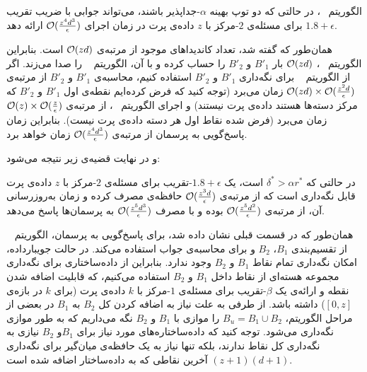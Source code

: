  
 الگوریتم ~، در حالتی که دو توپ بهینه $\alpha$-جداپذیر باشند، می‌تواند جوابی با ضریب تقریب $1.8 + \epsilon$ برای مسئله‌ی $2$-مرکز با $z$ داده‌ی پرت در زمان اجرای $\mathcal{O}(\frac{z^4d^3}{\epsilon})$ ارائه دهد.
 
 
 همان‌طور که گفته شد، تعداد کاندیداهای موجود از مرتبه‌ی $\mathcal{O}(zd)$ است.
 بنابراین الگوریتم ~، $\mathcal{O}(zd)$ بار $B'_1$ و $B'_2$ را حساب کرده و با آن، الگوریتم ~ را صدا می‌زند.
 اگر از الگوریتم ~ برای نگه‌داری $B'_1$ و $B'_2$ استفاده کنیم، محاسبه‌ی $B'_1$ و $B'_2$ از مرتبه‌ی $ \mathcal{O}(zd) \times \mathcal{O}(\frac{z^2d}{\epsilon})$ زمان می‌برد (توجه کنید که فرض کرد‌ه‌ایم نقطه‌ی اول $B'_1$ و $B'_2$ که مرکز دسته‌ها هستند داده‌ی پرت نیستند) و اجرای الگوریتم ~، از مرتبه‌ی $\mathcal{O}(z) \times \mathcal{O}(\frac{z}{\epsilon})$ زمان می‌برد‌ (فرض شده نقاط اول هر دسته داده‌ی پرت نیست). بنابراین زمان پاسخ‌گویی به پرسمان از مرتبه‌ی $\mathcal{O}(\frac{z^4d^3}{\epsilon})$ زمان خواهد برد.
 

و در نهایت قضیه‌ی زیر نتیجه می‌شود:

در حالتی که $\delta^* > \alpha r^*$ است، یک $1.8 + \epsilon$-تقریب برای مسئله‌ی $2$-مرکز با $z$ داده‌ی پرت قابل نگه‌داری است که از مرتبه‌ی $\mathcal{O}(\frac{z^3d}{\epsilon})$ حافظه‌ی مصرف کرده و زمان به‌روزرسانی آن، از مرتبه‌ی $\mathcal{O}(\frac{z^5d^2}{\epsilon})$ بوده و با مصرف $\mathcal{O}(\frac{z^5d^3}{\epsilon})$ به پرسمان‌ها پاسخ می‌دهد.

همان‌طور که در قسمت قبلی نشان داده شد، برای پاسخ‌گویی به پرسمان، الگوریتم ~ از تقسیم‌بندی $B_1$، $B_2$ و  برای محاسبه‌ی جواب استفاده می‌کند.
در حالت جویبارداده، امکان نگه‌داری تمام نقاط $B_1$ و $B_2$ وجود ندارد.
بنابراین از داده‌ساختاری برای نگه‌داری مجموعه‌ هسته‌ای از نقاط داخل $B_1$ و $B_2$ استفاده می‌کنیم، که قابلیت اضافه شدن نقطه و ارائه‌ی یک $\beta$-تقریب برای مسئله‌ی $1$-مرکز با $k$ داده‌ی پرت (برای $k$ در بازه‌ی $[0, z]$) داشته باشد.
از طرفی به علت نیاز به اضافه کردن کل $B_2$ به $B_1$ در بعضی از مراحل الگوریتم، $B_u = B_1 \cup B_2$ را موازی با $B_1$ و $B_2$ نگه می‌داریم که به طور موازی نگه‌داری می‌شود.
توجه کنید که داده‌ساختاره‌های مورد نیاز برای $B_1$و  $B_2$ نیازی به نگه‌داری کل نقاط ندارند، بلکه تنها نیاز به یک حافظه‌ی میان‌گیر برای نگه‌داری $(z+1)(d+1)$ آخرین نقاطی که به داده‌ساختار اضافه شده است.

